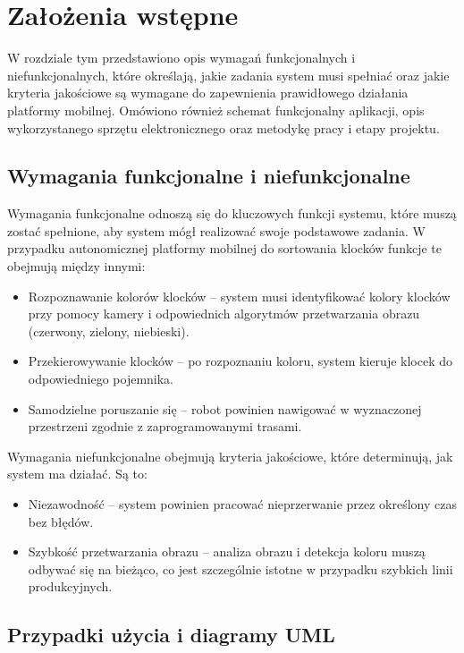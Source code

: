 \chapter{Założenia wstępne}
\label{ch:zalozenia-wstepne}

W rozdziale tym przedstawiono opis wymagań funkcjonalnych i niefunkcjonalnych, które określają, jakie zadania system musi spełniać oraz jakie kryteria jakościowe są wymagane do zapewnienia prawidłowego działania platformy mobilnej. Omówiono również schemat funkcjonalny aplikacji, opis wykorzystanego sprzętu elektronicznego oraz metodykę pracy i etapy projektu.


\section{Wymagania funkcjonalne i niefunkcjonalne}
Wymagania funkcjonalne odnoszą się do kluczowych funkcji systemu, które muszą zostać spełnione, aby system mógł realizować swoje podstawowe zadania. W przypadku autonomicznej platformy mobilnej do sortowania klocków funkcje te obejmują między innymi:
\begin{itemize}
    \item Rozpoznawanie kolorów klocków – system musi identyfikować kolory klocków przy pomocy kamery i odpowiednich algorytmów przetwarzania obrazu (czerwony, zielony, niebieski).
    \item Przekierowywanie klocków – po rozpoznaniu koloru, system kieruje klocek do odpowiedniego pojemnika.
    \item Samodzielne poruszanie się – robot powinien nawigować w wyznaczonej przestrzeni zgodnie z zaprogramowanymi trasami.
\end{itemize}

Wymagania niefunkcjonalne obejmują kryteria jakościowe, które determinują, jak system ma działać. Są to:

\begin{itemize}
    \item Niezawodność – system powinien pracować nieprzerwanie przez określony czas bez błędów.
    \item Szybkość przetwarzania obrazu – analiza obrazu i detekcja koloru muszą odbywać się na bieżąco, co jest szczególnie istotne w przypadku szybkich linii produkcyjnych.
\end{itemize}

\section{Przypadki użycia i diagramy UML}

